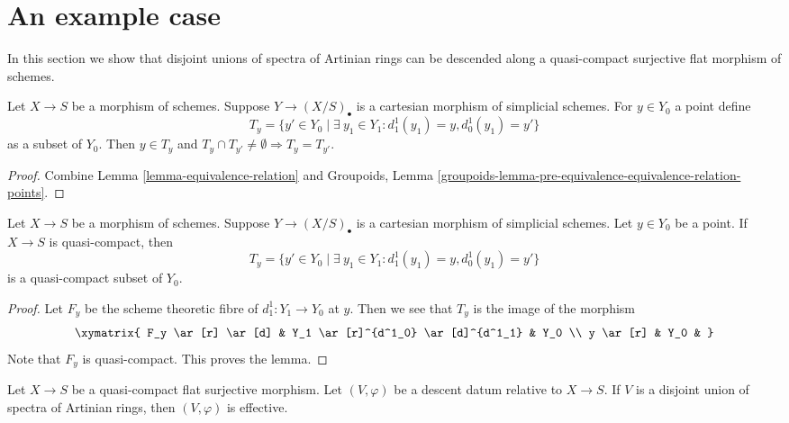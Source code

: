 \section{An example case}
\label{section-example}

\noindent
In this section we show that disjoint unions of spectra
of Artinian rings can be descended along a quasi-compact
surjective flat morphism of schemes.

\begin{lemma}
\label{lemma-equivalence-classes-points}
Let $X \to S$ be a morphism of schemes. Suppose $Y \to (X/S)_\bullet$
is a cartesian morphism of simplicial schemes. For $y \in Y_0$ a point define
$$
T_y = \{y' \in Y_0 \mid \exists\ y_1 \in Y_1:
d^1_1(y_1) = y, d^1_0(y_1) = y'\}
$$
as a subset of $Y_0$. Then $y \in T_y$ and
$T_y \cap T_{y'} \not = \emptyset \Rightarrow T_y = T_{y'}$.
\end{lemma}

\begin{proof}
Combine Lemma \ref{lemma-equivalence-relation} and
Groupoids, Lemma
\ref{groupoids-lemma-pre-equivalence-equivalence-relation-points}.
\end{proof}

\begin{lemma}
\label{lemma-quasi-compact}
Let $X \to S$ be a morphism of schemes.
Suppose $Y \to (X/S)_\bullet$ is a cartesian morphism of simplicial schemes.
Let $y \in Y_0$ be a point. If $X \to S$ is quasi-compact, then
$$
T_y = \{y' \in Y_0 \mid \exists\ y_1 \in Y_1:
d^1_1(y_1) = y, d^1_0(y_1) = y'\}
$$
is a quasi-compact subset of $Y_0$.
\end{lemma}

\begin{proof}
Let $F_y$ be the scheme theoretic fibre of $d^1_1 : Y_1 \to Y_0$
at $y$. Then we see that $T_y$ is the image of the morphism
$$
\xymatrix{
F_y \ar[r] \ar[d] &
Y_1 \ar[r]^{d^1_0} \ar[d]^{d^1_1} &
Y_0 \\
y \ar[r] &
Y_0 &
}
$$
Note that $F_y$ is quasi-compact. This proves the lemma.
\end{proof}

\begin{lemma}
\label{lemma-descent-disjoint-union-Artinian-along-fields}
Let $X \to S$ be a quasi-compact flat surjective morphism.
Let $(V, \varphi)$ be a descent datum relative
to $X \to S$. If $V$ is a disjoint union of
spectra of Artinian rings, then $(V, \varphi)$ is effective.
\end{lemma}

